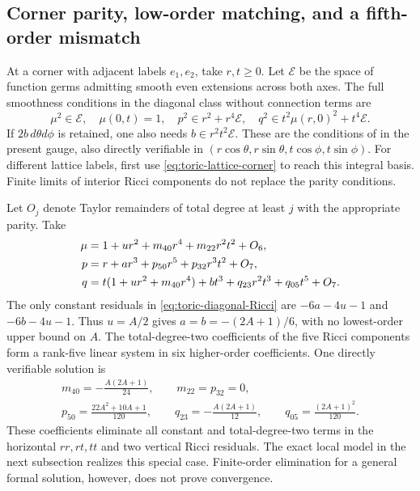 \documentclass[a4paper,11pt]{article}
\numberwithin{equation}{section}
\theoremstyle{definition}
\begin{document}
\subsection{Corner parity, low-order matching, and a fifth-order mismatch}
At a corner with adjacent labels $e_1,e_2$, take $r,t\ge0$.
Let $\mathcal E$ be the space of function germs admitting smooth even extensions across both axes.
The full smoothness conditions in the diagonal class without connection terms are
\begin{equation}\label{eq:toric-corner-jets}
 \mu^2\in\mathcal E,\quad\mu(0,t)=1,\quad
 p^2\in r^2+r^4\mathcal E,\quad
 q^2\in t^2\mu(r,0)^2+t^4\mathcal E.
\end{equation}
If $2b\,d\theta d\phi$ is retained, one also needs $b\in r^2t^2\mathcal E$.
These are the conditions of \cite[Lemma 2.2]{Liu2025} in the present gauge, also directly verifiable in
$(r\cos\theta,r\sin\theta,t\cos\phi,t\sin\phi)$.
For different lattice labels, first use \eqref{eq:toric-lattice-corner} to reach this integral basis.
Finite limits of interior Ricci components do not replace the parity conditions.

Let $O_j$ denote Taylor remainders of total degree at least $j$ with the appropriate parity. Take
\begin{align}
 \mu&=1+u r^2+m_{40}r^4+m_{22}r^2t^2+O_6,\notag\\
 p&=r+a r^3+p_{50}r^5+p_{32}r^3t^2+O_7,\notag\\
 q&=t(1+u r^2+m_{40}r^4)+b t^3+q_{23}r^2t^3+q_{05}t^5+O_7.
 \label{eq:toric-corner-polynomial}
\end{align}
The only constant residuals in \eqref{eq:toric-diagonal-Ricci} are
$-6a-4u-1$ and $-6b-4u-1$.
Thus $u=A/2$ gives $a=b=-(2A+1)/6$, with no lowest-order upper bound on $A$.
The total-degree-two coefficients of the five Ricci components form a rank-five linear system in six higher-order coefficients.
One directly verifiable solution is
\begin{equation}\label{eq:toric-corner-order2}
 \begin{gathered}
 m_{40}=-\frac{A(2A+1)}{24},\qquad m_{22}=p_{32}=0,\\
 p_{50}=\frac{22A^2+10A+1}{120},\qquad
 q_{23}=-\frac{A(2A+1)}{12},\qquad
 q_{05}=\frac{(2A+1)^2}{120}.
 \end{gathered}
\end{equation}
These coefficients eliminate all constant and total-degree-two terms in the horizontal $rr,rt,tt$ and two vertical Ricci residuals.
The exact local model in the next subsection realizes this special case.
Finite-order elimination for a general formal solution, however, does not prove convergence.
\end{document}
